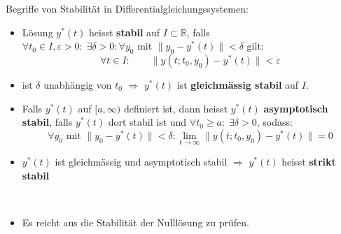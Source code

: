 \documentclass[a4paper]{article}
\newcommand{\R}{\mathbb{R}}
\begin{document}
Begriffe von Stabilität in Differentialgleichungssystemen:

\begin{itemize}
	\item Lösung $y^{*} (t)$ heisst \textbf{stabil} auf $I \subset \R$,
		falls $\forall t_0 \in I, \varepsilon > 0: \;
		\exists \delta > 0: \forall y_0 \text{ mit }
		\| y_0 - y^{*} (t) \| < \delta$ gilt:
		\[
			\forall t \in I: \qquad
			\| y(t; t_0, y_0) - y^{*} (t) \| < \varepsilon
		\] 
	\item ist $\delta$ unabhängig von $t_0$ $\Rightarrow$
		$y^{*} (t)$ ist \textbf{gleichmässig stabil} auf $I$.
	\item Falls $y ^{*} (t)$ auf $[a, \infty)$ definiert ist, dann heisst
		$y^{*} (t)$ \textbf{asymptotisch stabil}, falls $y ^{*} (t)$
		dort stabil ist und $\forall t_0 \geq a:\; \exists \delta > 0$,
		sodass:
		\[
		\forall y_0 \text{ mit } \| y_0 - y^{*} (t) \| < \delta :
		\lim_{t \to \infty} \| y(t; t_0, y_0) - y^{*} (t) \| = 0
		\] 
	\item $y ^{*} (t)$ ist gleichmässig und asymptotisch stabil
		$\Rightarrow$ $y ^{*} (t)$ heisst \textbf{strikt stabil} 
\end{itemize}
\\

\begin{itemize}
	\item Es reicht aus die Stabilität der Nulllösung zu prüfen.
\end{itemize}
\end{document}
